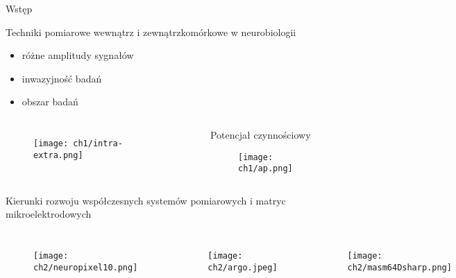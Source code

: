 

\begin{frame}{Wstęp}

    \begin{block}{Techniki pomiarowe wewnątrz i zewnątrzkomórkowe w neurobiologii}
        \begin{itemize}
            \item różne amplitudy sygnałów
            \item inwazyjność badań
            \item obszar badań 
        \end{itemize}
    \end{block}
    \vspace{-3mm} %

\begin{columns}
        \begin{figure}[H]
            \texttt{[image: ch1/intra-extra.png]}  
        \end{figure}

        \begin{alertblock}{Potencjał czynnościowy}
            \begin{figure}[H]
                \texttt{[image: ch1/ap.png]}
            \end{figure}
        \end{alertblock}

    \end{columns}


    
\end{frame}

\begin{frame}{Kierunki rozwoju współczesnych systemów pomiarowych i matryc mikroelektrodowych}
    \vspace{-5mm} %

    \begin{columns}[t]
        \begin{figure}[H]
            \texttt{[image: ch2/neuropixel10.png]}  
        \end{figure}

        \begin{figure}[H]
            \texttt{[image: ch2/argo.jpeg]}  
        \end{figure}

        \begin{figure}[H]
            \texttt{[image: ch2/masm64Dsharp.png]}
        \end{figure}

        \begin{figure}[H]
            \texttt{[image: ch2/utahArr.png]}
        \end{figure}

    \end{columns}


\end{frame}


